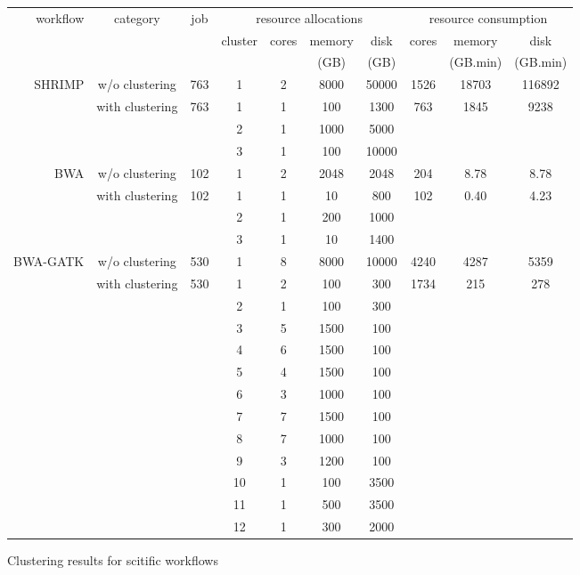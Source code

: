 \documentclass[conference]{IEEEtran}
\begin{document}
\begin{figure}[t]
  \centering 
\begin{tabular}{r|ccccccccc}
\hline
\multirow{2}{*}{workflow} & \multirow{2}{*}{category} & \multirow{2}{*}{job} & \multicolumn{4}{c}{resource allocations} & \multicolumn{3}{c}{resource consumption}\\
&&& cluster & cores & memory & disk & cores & memory & disk\\ 
&&&&& (GB) & (GB) & & (GB.min) & (GB.min)\\
\hline
\multirow{4}{*}{SHRIMP} & w/o clustering & 763 & 1 & 2 & 8000 & 50000 & 1526 & 18703 & 116892\\
& \multirow{3}{*}{with clustering} & \multirow{3}{*}{763} & 1 & 1 & 100 & 1300 & \multirow{3}{*}{763} & \multirow{3}{*}{1845} & \multirow{3}{*}{9238}\\
&&& 2 & 1 & 1000 & 5000\\
&&& 3 & 1 & 100 & 10000\\
\hline
\multirow{4}{*}{BWA} & w/o clustering & 102 & 1 & 2 & 2048 & 2048 & 204 & 8.78 & 8.78\\
& \multirow{3}{*}{with clustering} & \multirow{3}{*}{102} & 1 & 1 & 10 & 800 & \multirow{3}{*}{102} & \multirow{3}{*}{0.40} & \multirow{3}{*}{4.23}\\
&&& 2 & 1 & 200 & 1000\\
&&& 3 & 1 & 10 & 1400\\
\hline
\multirow{13}{*}{BWA-GATK} & w/o clustering & 530 & 1 & 8 & 8000 & 10000 & 4240 & 4287 & 5359\\
& \multirow{12}{*}{with clustering} & \multirow{12}{*}{530} & 1 & 2 & 100 & 300 & \multirow{12}{*}{1734} & \multirow{12}{*}{215} & \multirow{12}{*}{278}\\
&&& 2 & 1 & 100 & 300\\
&&& 3 & 5 & 1500 & 100\\
&&& 4 & 6 & 1500 & 100\\
&&& 5 & 4 & 1500 & 100\\
&&& 6 & 3 & 1000 & 100\\
&&& 7 & 7 & 1500 & 100\\
&&& 8 & 7 & 1000 & 100\\
&&& 9 & 3 & 1200 & 100\\
&&& 10 & 1 & 100 & 3500\\
&&& 11 & 1 & 500 & 3500\\
&&& 12 & 1 & 300 & 2000\\
\hline
\end{tabular} 
\caption{Clustering results for scitific workflows}
\end{figure}
\end{document}
